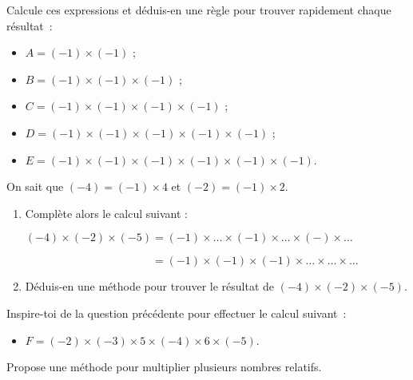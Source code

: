 
\begin{activite}

\begin{partie}
Calcule ces expressions et déduis-en une règle pour trouver rapidement chaque résultat :
\begin{itemize}
 \item $A = (-1) \times (-1)$ ;
 \item $B = (-1) \times (-1) \times (-1)$ ;
 \item $C = (-1) \times (-1) \times (-1) \times (-1)$ ;
 \item $D = (-1) \times (-1) \times (-1) \times (-1) \times (-1)$ ;
 \item $E = (-1) \times (-1) \times (-1) \times (-1) \times (-1) \times (-1)$.
 \end{itemize}
\end{partie}

\begin{partie}
On sait que $(-4) = (-1) \times 4$ et $(-2) = (-1) \times 2$.
\begin{enumerate}
 \item Complète alors le calcul suivant :
\begin{center} $(-4) \times (-2) \times (-5) = (-1) \times \ldots \times (-1) \times \ldots \times (- ) \times \ldots$ \end{center}
\begin{center} $\phantom{(-4) \times (-2) \times (-5) }= (-1) \times (-1) \times (-1) \times \ldots \times \ldots \times \ldots$ \end{center}
 \item Déduis-en une méthode pour trouver le résultat de $(-4) \times (-2) \times (-5)$.
 \end{enumerate}
\end{partie}

\begin{partie}
Inspire-toi de la question précédente pour effectuer le calcul suivant :
\begin{itemize}
 \item $F = (-2) \times (-3) \times 5 \times (-4) \times 6 \times (-5)$.
 \end{itemize}
\end{partie}

\begin{partie}
Propose une méthode pour multiplier plusieurs nombres relatifs.
\end{partie}

\end{activite}

